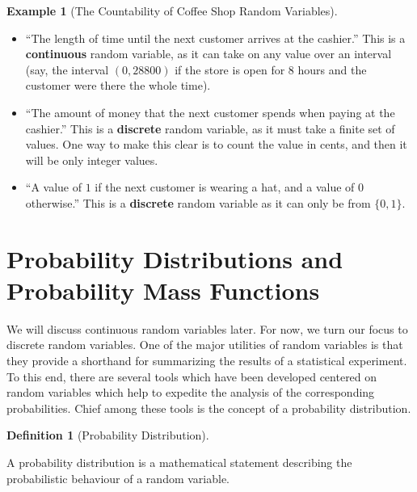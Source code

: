 \documentclass[
  letterpaper,
  DIV=11,
  numbers=noendperiod]{scrreprt}
\theoremstyle{definition}
\newtheorem{definition}{Definition}[chapter]
\theoremstyle{definition}
\theoremstyle{definition}
\newtheorem{example}{Example}[chapter]
\theoremstyle{remark}
\begin{document}
\begin{example}[The Countability of Coffee Shop Random
Variables]
\begin{tcolorbox}[enhanced jigsaw, colback=white, breakable, rightrule=.15mm, leftrule=.75mm, toprule=.15mm, left=2mm, arc=.35mm, opacityback=0, bottomrule=.15mm]
\begin{itemize}
  ``A count of the number of red items of clothing that can be seen
  being worn by the next \(15\) customers.''

  These are all \textbf{discrete} random variables, as the only values
  they can take on are the counting integer values.
\item
  ``The length of time until the next customer arrives at the cashier.''
  This is a \textbf{continuous} random variable, as it can take on any
  value over an interval (say, the interval \((0,28800)\) if the store
  is open for \(8\) hours and the customer were there the whole time).
\item
  ``The amount of money that the next customer spends when paying at the
  cashier.'' This is a \textbf{discrete} random variable, as it must
  take a finite set of values. One way to make this clear is to count
  the value in cents, and then it will be only integer values.
\item
  ``A value of \(1\) if the next customer is wearing a hat, and a value
  of \(0\) otherwise.'' This is a \textbf{discrete} random variable as
  it can only be from \(\{0,1\}\).
\end{itemize}

\end{tcolorbox}

\end{example}

\section{Probability Distributions and Probability Mass
Functions}\label{probability-distributions-and-probability-mass-functions}

We will discuss continuous random variables later. For now, we turn our
focus to discrete random variables. One of the major utilities of random
variables is that they provide a shorthand for summarizing the results
of a statistical experiment. To this end, there are several tools which
have been developed centered on random variables which help to expedite
the analysis of the corresponding probabilities. Chief among these tools
is the concept of a probability distribution.

\begin{definition}[Probability
Distribution]\protect\hypertarget{def-probability-distribution}{}\label{def-probability-distribution}

A probability distribution is a mathematical statement describing the
probabilistic behaviour of a random variable.

\end{definition}
\end{document}

